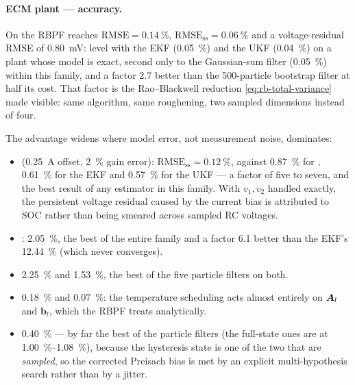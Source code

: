 \paragraph{ECM plant --- accuracy.}  On  the RBPF reaches
$\mathrm{RMSE} = \SI{0.14}{\percent}$, $\mathrm{RMSE}_{\mathrm{ss}} = \SI{0.06}{\percent}$ and a
voltage-residual RMSE of \SI{0.80}{\milli\volt}: level with the EKF (\SI{0.05}{\percent}) and the
UKF (\SI{0.04}{\percent}) on a plant whose model is exact, second only to the Gaussian-sum filter
(\SI{0.05}{\percent}) within this family, and a factor \num{2.7} better than the 500-particle
bootstrap filter at half its cost.  That factor is the Rao--Blackwell reduction
\eqref{eq:rb-total-variance} made visible: same algorithm, same roughening, two sampled dimensions
instead of four.

The advantage widens where model error, not measurement noise, dominates:
\begin{itemize}[leftmargin=2em]
  \item {} (\SI{0.25}{\ampere} offset, \SI{2}{\percent} gain error):
        $\mathrm{RMSE}_{\mathrm{ss}} = \SI{0.12}{\percent}$, against \SI{0.87}{\percent} for
        , \SI{0.61}{\percent} for the EKF and \SI{0.57}{\percent} for the UKF
        --- a factor of five to seven, and the best result of any estimator in this family.  With
        $v_1,v_2$ handled exactly, the persistent voltage residual caused by the current bias is
        attributed to SOC rather than being smeared across sampled RC voltages.
  \item {}: \SI{2.05}{\percent}, the best of the entire family and a factor \num{6.1}
        better than the EKF's \SI{12.44}{\percent} (which never converges).
  \item {} \SI{2.25}{\percent} and  \SI{1.53}{\percent}, the
        best of the five particle filters on both.
  \item {} \SI{0.18}{\percent} and  \SI{0.07}{\percent}: the temperature
        scheduling acts almost entirely on $\bm{A}_l$ and $\bm b_l$, which the RBPF treats
        analytically.
  \item {} \SI{0.40}{\percent} --- by far the best of the particle filters (the
        full-state ones are at \SIrange{1.00}{1.08}{\percent}), because the hysteresis state is one
        of the two that are \emph{sampled}, so the corrected Preisach bias is met by an explicit
        multi-hypothesis search rather than by a jitter.
\end{itemize}

